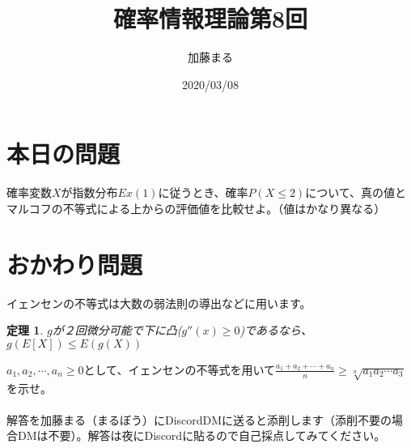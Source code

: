 \documentclass[a4j,uplatex,dvipdfmx]{jsarticle}
\title{確率情報理論第8回}
\author{加藤まる}
\date{2020/03/08}
\newtheorem{theorem1}{定理}
\begin{document}
\maketitle

\section*{本日の問題}
確率変数$X$が指数分布$Ex(1)$に従うとき、確率$P(X\le 2)$について、真の値とマルコフの不等式による上からの評価値を比較せよ。（値はかなり異なる）

\section*{おかわり問題}
イェンセンの不等式は大数の弱法則の導出などに用います。
  \begin{tcolorbox}[
  title = イェンセンの不等式,
  ]
    \begin{theorem1}
      $g$が２回微分可能で下に凸($g''(x)\ge 0$)であるなら、$g(E[X])\le E(g(X))$
    \end{theorem1}
  \end{tcolorbox}
$a_1,a_2,\cdots ,a_n \ge 0$として、イェンセンの不等式を用いて$\frac{a_1+a_2+\cdots +a_n}{n}\ge \sqrt[n]{a_1a_2\cdots a_3}$\\を示せ。
\\
\\
解答を加藤まる（まるぼう）にDiscordDMに送ると添削します（添削不要の場合DMは不要）。解答は夜にDiscordに貼るので自己採点してみてください。
\end{document}
